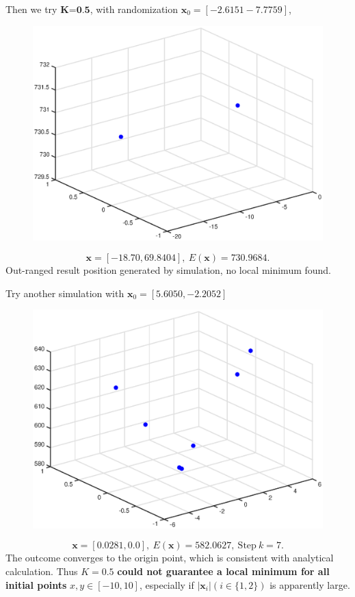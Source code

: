 \documentclass{article}
\begin{document}
\noindent
Then we try $\textbf{K=0.5}$, with randomization $\mathbf{x}_0 = [-2.6151 -7.7759]$,
\begin{figure}[h]
    \centering
    \includegraphics[scale=0.46]{12}
\end{figure}
$$\mathbf{x} = [-18.70 , 69.8404],~E(\mathbf{x}) = 730.9684.$$
Out-ranged result position generated by simulation, no local minimum found.

Try another simulation with $\mathbf{x}_0 = [5.6050,-2.2052]$
\begin{figure}[h]
    \centering
    \includegraphics[scale=0.46]{13}
\end{figure}
$$\mathbf{x} = [0.0281,0.0],~E(\mathbf{x}) = 582.0627,~\text{Step}~k = 7.$$
The outcome converges to the origin point, which is consistent with analytical calculation. Thus $K=0.5$ \textbf{could not guarantee a local minimum for all initial points} $x,y\in[-10,10]$, especially if $|\mathbf{x}_i|(i\in\{1,2\})$ is apparently large.
\end{document}
